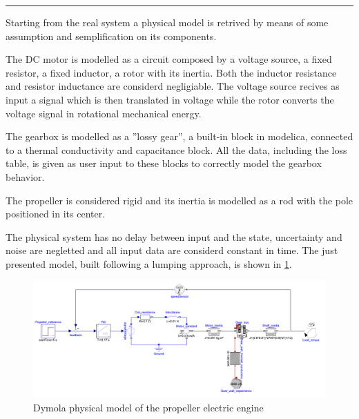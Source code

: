 \documentclass[11pt,a4paper,oneside]{article}
\begin{document}
\medskip
\medskip \hrule \medskip
{}
\clearpage

Starting from the real system a physical model is retrived by means of some assumption and semplification on its components. 

The DC motor is modelled as a circuit composed by a voltage source, a fixed resistor, a fixed inductor, a rotor with its inertia.
Both the inductor resistance and resistor inductance are considerd negligiable.
The voltage source recives as input a signal which is then translated in voltage while the rotor converts the voltage signal in rotational mechanical energy.

The gearbox is modelled as a ''lossy gear'', a built-in block in modelica, connected to a thermal conductivity and capacitance block.
All the data, including the loss table, is given as user input to these blocks to correctly model the gearbox behavior.

The propeller is considered rigid and its inertia is modelled as a rod with the pole positioned in its center.

The physical system has no delay between input and the state, uncertainty and noise are negletted and all input data are considerd constant in time. 
The just presented model, built following a lumping approach, is shown in \cref{fig:ex2a_droneModel}.
\begin{figure}[H]
    \centering
    \includegraphics*[width=1\textwidth, keepaspectratio]{Figures/ex2a_blockDiag.pdf}
    \caption[]{\label{fig:ex2a_droneModel} Dymola physical model of the propeller electric engine}
\end{figure}
\end{document}
